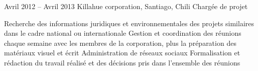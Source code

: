 \documentclass{tccv}
\begin{document}
\begin{textblock}{13}
\begin{mdframed}
\begin{eventlist}
\item{Avril 2012 -- Avril 2013 }     
  {Killahue corporation, Santiago, Chili}     
  {Chargée de projet}

\begin{itemize}
      \setlength\itemsep{0cm} 
      \cvitem[\checkmark] Recherche des informations juridiques et environnementales des projets similaires dans le cadre national ou internationale
      \cvitem[\checkmark] Gestion et coordination des réunions chaque semaine avec les membres de la corporation, plus la préparation des matériaux visuel et écrit
      \cvitem[\checkmark] Administration de réseaux sociaux 
      \cvitem[\checkmark] Formalisation et rédaction du travail réalisé et des décisions pris dans l’ensemble des réunions

\end{itemize}      
    

   


\end{eventlist}


\end{mdframed}
\end{textblock}
\end{document}
